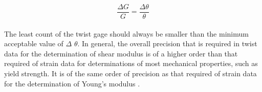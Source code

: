 \documentclass[12pt,a4paper]{article}	%
\begin{document}
	\[ \frac{\Delta G}{G} = \frac{\Delta \theta }{\theta} \] \\
	
	
	
	The least count of the twist gage should always be smaller than the minimum acceptable value of $\Delta$ $\theta$. In general, the overall precision that is required in twist data for the determination of shear modulus is of a higher order than that required of strain data for determinations of most mechanical properties, such as yield strength. It is of the same order of precision as that required of strain data for the determination of Young's modulus .

\thispagestyle{empty}	%
\end{document}
